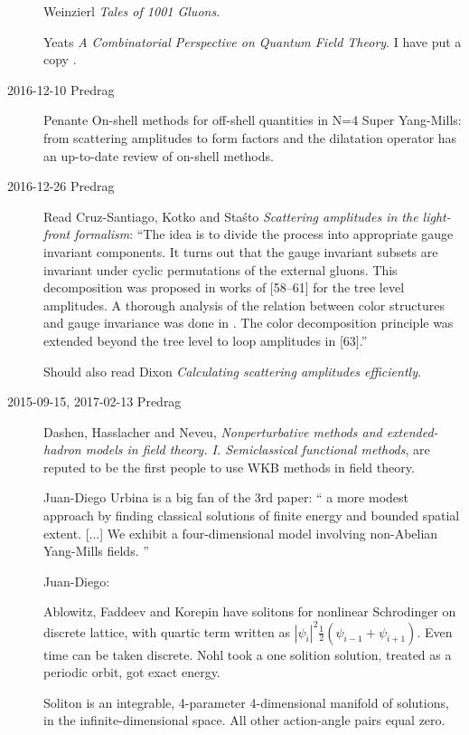 \begin{description}
Weinzierl {\em Tales of 1001 Gluons}.

Yeats {\em {A Combinatorial Perspective on Quantum Field Theory}}.
I have put a copy .

\item[2016-12-10 Predrag]
Penante {{On-shell methods for off-shell quantities in N=4
Super Yang-Mills: from scattering amplitudes to form factors and the
dilatation operator}} has an up-to-date review of on-shell methods.

\item[2016-12-26 Predrag] Read
Cruz-Santiago, Kotko and Sta{\'s}to
{\em Scattering amplitudes in the light-front formalism}:
``The idea is to divide the process into appropriate gauge invariant
components. It turns out that the gauge invariant subsets are invariant
under cyclic permutations of the external gluons. This decomposition was
proposed in works of [58–61] for the tree level amplitudes. A thorough
analysis of the relation between color structures and gauge invariance
was done in . The color decomposition principle was
extended beyond the tree level to loop amplitudes in [63].''

Should also read Dixon
{\em Calculating scattering amplitudes efficiently}.

\item[2015-09-15, 2017-02-13 Predrag]
Dashen, Hasslacher and Neveu,
\emph{Nonperturbative methods and extended-hadron models in field theory.
{I}. {Semiclassical} functional methods},
are reputed to be the first people to use WKB methods in field theory.


Juan-Diego Urbina is a big fan of the 3rd paper:
``
a more modest approach by finding classical
solutions of finite energy and bounded spatial extent.
[...]
We exhibit a four-dimensional model involving non-Abelian Yang-Mills fields.
''

Juan-Diego:

Ablowitz, Faddeev and Korepin have solitons for nonlinear Schrodinger on discrete
lattice, with quartic term written as
$|\psi_i|^2\frac{1}{2}(\psi_{i-1}+\psi_{i+1})$. Even time can be taken
discrete. Nohl took a one solition solution, treated as a periodic
orbit, got exact energy.

Soliton is an integrable, 4-parameter 4-dimensional manifold of solutions, in the
infinite-dimensional space. All other action-angle pairs equal zero.


\end{description}
